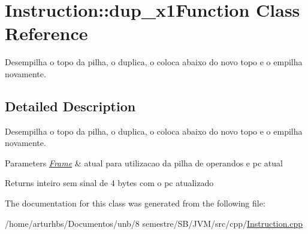 \hypertarget{classInstruction_1_1dup__x1Function}{}\section{Instruction\+:\+:dup\+\_\+x1\+Function Class Reference}
\label{classInstruction_1_1dup__x1Function}


Desempilha o topo da pilha, o duplica, o coloca abaixo do novo topo e o empilha novamente.  




\subsection{Detailed Description}
Desempilha o topo da pilha, o duplica, o coloca abaixo do novo topo e o empilha novamente. 


\begin{DoxyParams}{Parameters}
{\em \hyperlink{classFrame}{Frame}} & atual para utilizacao da pilha de operandos e pc atual \\
\hline
\end{DoxyParams}
\begin{DoxyReturn}{Returns}
inteiro sem sinal de 4 bytes com o pc atualizado 
\end{DoxyReturn}


The documentation for this class was generated from the following file\+:\begin{DoxyCompactItemize}
\item 
/home/arturhbs/\+Documentos/unb/8 semestre/\+S\+B/\+J\+V\+M/src/cpp/\hyperlink{Instruction_8cpp}{Instruction.\+cpp}\end{DoxyCompactItemize}
